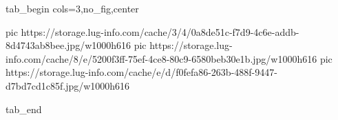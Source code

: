 
 
 
 
 


\ifcmt
  tab_begin cols=3,no_fig,center

     pic https://storage.lug-info.com/cache/3/4/0a8de51c-f7d9-4c6e-addb-8d4743ab8bee.jpg/w1000h616%
		 pic https://storage.lug-info.com/cache/8/e/5200f3ff-75ef-4ce8-80c9-6580beb30e1b.jpg/w1000h616%
		 pic https://storage.lug-info.com/cache/e/d/f0fefa86-263b-488f-9447-d7bd7cd1c85f.jpg/w1000h616%

  tab_end
\fi
